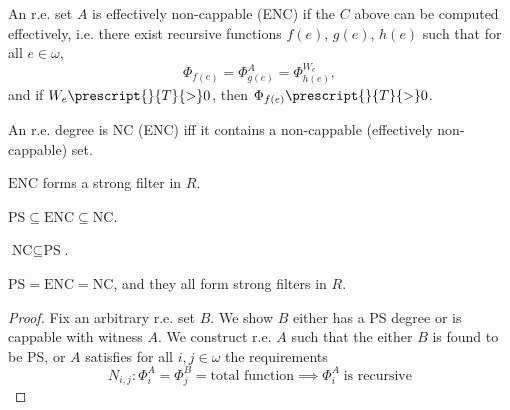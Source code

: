   \begin{recall}
    An r.e. set $A$ is effectively non-cappable (ENC) if the $C$ above can
    be computed effectively, i.e. there exist recursive functions
    $f(e)$, $g(e)$, $h(e)$ such that for all $e\in\omega$,
    \[\Phi_{f(e)} =\Phi_{g(e)}^A =\Phi_{h(e)}^{W_e},\]
    and if $W_e\prescript{}{T}{>}0$, then $\Phi_{f(e)}\prescript{}{T}{>}0$.
  \end{recall}

  \begin{recall}
    An r.e. degree is NC (ENC) iff it contains a non-cappable (effectively
    non-cappable) set.
  \end{recall}

  \begin{recall}
    $\text{ENC}$ forms a strong filter in $R$.
  \end{recall}

  \begin{recall}
    $\text{PS} \subseteq \text{ENC} \subseteq \text{NC}$.
  \end{recall}

  \begin{goal}
    $\text{NC} \subseteq \text{PS}$.
  \end{goal}

  \begin{corollary}
    $\text{PS}=\text{ENC}=\text{NC}$, and they all form strong filters in
    $R$.
  \end{corollary}

  \begin{proof}
    Fix an arbitrary r.e. set $B$. We show $B$ either has a PS degree or is
    cappable with witness $A$. We construct r.e. $A$ such that the either
    $B$ is found to be PS, or $A$ satisfies for all $i,j\in\omega$ the
    requirements
    \begin{equation}
      N_{i,j}: \Phi_i^A=\Phi_j^B =\text{total function} \implies
      \Phi_i^A\; \text{is recursive}
      \label{eqn:cappable1}
    \end{equation}
  \end{proof}

